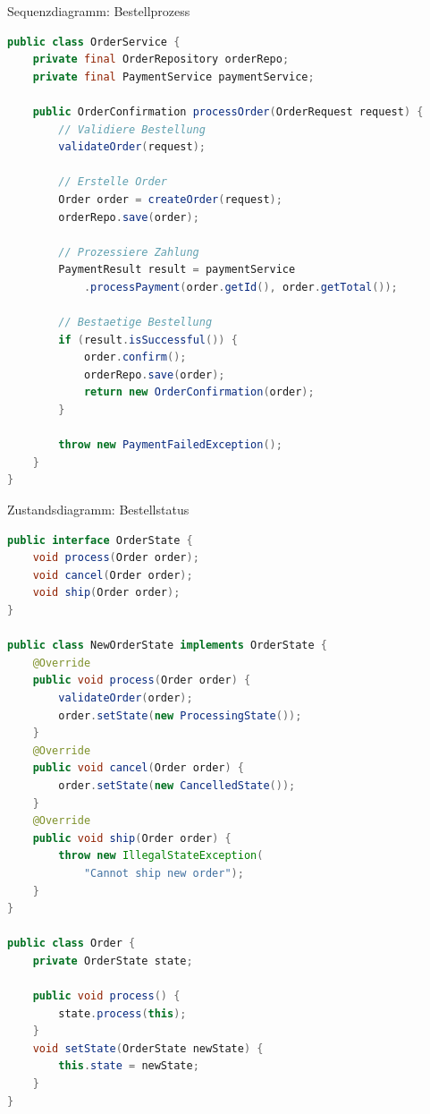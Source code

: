 \begin{example2}{Sequenzdiagramm: Bestellprozess}
\begin{lstlisting}[language=Java, style=basesmol]
public class OrderService {
    private final OrderRepository orderRepo;
    private final PaymentService paymentService;
    
    public OrderConfirmation processOrder(OrderRequest request) {
        // Validiere Bestellung
        validateOrder(request);
        
        // Erstelle Order
        Order order = createOrder(request);
        orderRepo.save(order);
        
        // Prozessiere Zahlung
        PaymentResult result = paymentService
            .processPayment(order.getId(), order.getTotal());
            
        // Bestaetige Bestellung
        if (result.isSuccessful()) {
            order.confirm();
            orderRepo.save(order);
            return new OrderConfirmation(order);
        }
        
        throw new PaymentFailedException();
    }
}
\end{lstlisting}
\end{example2}

\begin{example2}{Zustandsdiagramm: Bestellstatus}
\begin{lstlisting}[language=Java, style=basesmol]
public interface OrderState {
    void process(Order order);
    void cancel(Order order);
    void ship(Order order);
}

public class NewOrderState implements OrderState {
    @Override
    public void process(Order order) {
        validateOrder(order);
        order.setState(new ProcessingState());
    }
    @Override
    public void cancel(Order order) {
        order.setState(new CancelledState());
    }
    @Override
    public void ship(Order order) {
        throw new IllegalStateException(
            "Cannot ship new order");
    }
}

public class Order {
    private OrderState state;
    
    public void process() {
        state.process(this);
    }
    void setState(OrderState newState) {
        this.state = newState;
    }
}
\end{lstlisting}
\end{example2}

